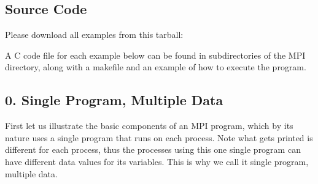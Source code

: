 \documentclass[letterpaper,10pt,openany,oneside]{sphinxmanual}
\begin{document}
\subsection{Source Code}
\label{MessagePassing/MPI_Patternlets:source-code}
Please download all examples from this tarball:

A C code file for each example below can be found in subdirectories of the MPI directory,
along with a makefile and an example of how to execute the program.


\subsection{0. Single Program, Multiple Data}
\label{MessagePassing/MPI_Patternlets:single-program-multiple-data}
First let us illustrate the basic components of an MPI program,
which by its nature uses a single program that runs on each process.
Note what gets printed is different for each process, thus the
processes using this one single program can have different data values
for its variables.  This is why we call it single program, multiple data.
\end{document}
